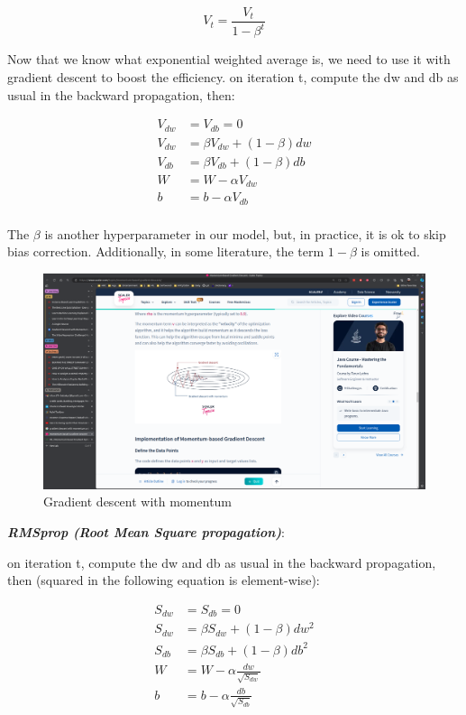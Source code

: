 \documentclass[12pt]{report}
\begin{document}
\begin{equation}
  V_t = \frac{V_{t}}{1-\beta^t}
\end{equation}


Now that we know what exponential weighted average is, we need to use it with gradient descent to boost the efficiency. on iteration t, compute the dw and db as usual in the backward propagation, then:

\begin{align}
  V_{dw} &= V_{db} = 0 \\
  V_{dw} &= \beta V_{dw} + (1-\beta) dw \\
  V_{db} &=  \beta V_{db} + (1-\beta) db \\
  W &= W- \alpha V_{dw} \\
  b &= b- \alpha V_{db} \\
\end{align}

The $\beta$ is another hyperparameter in our model, but, in practice, it is ok to skip bias correction. Additionally, in some literature, the term $1-\beta$ is omitted.

\begin{figure}[htbp]
  \begin{center}
    \includegraphics[trim =25cm 22.0cm 40cm 20.0cm, clip, scale=0.4]{pics/GD_with_momentum.png}
    \caption{Gradient descent with momentum}
  \end{center}
\end{figure}


\textbf{\textit{RMSprop (Root Mean Square propagation)}}:

on iteration t, compute the dw and db as usual in the backward propagation, then (squared in the following equation is element-wise):

\begin{align}
  S_{dw} &= S_{db} = 0 \\
  S_{dw} &= \beta S_{dw} + (1-\beta) dw^2\\
  S_{db} &= \beta S_{db} + (1-\beta) db^2\\
  W &= W- \alpha \frac{dw}{\sqrt{S_{dw}}} \\
  b &= b- \alpha \frac{db}{\sqrt{S_{db}}} \\
\end{align}
\end{document}
